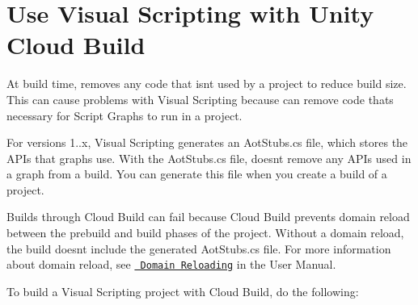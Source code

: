 \chapter{Use Visual Scripting with Unity Cloud Build}
\hypertarget{md__hey_tea_9_2_library_2_package_cache_2com_8unity_8visualscripting_0d1_88_80_2_documentation_0i_2vs-aot}{}\label{md__hey_tea_9_2_library_2_package_cache_2com_8unity_8visualscripting_0d1_88_80_2_documentation_0i_2vs-aot}
\label{md__hey_tea_9_2_library_2_package_cache_2com_8unity_8visualscripting_0d1_88_80_2_documentation_0i_2vs-aot_autotoc_md5168}%
%
 At build time,  removes any code that isn\textquotesingle{}t used by a project to reduce build size. This can cause problems with Visual Scripting because  can remove code that\textquotesingle{}s necessary for Script Graphs to run in a project.

For versions 1..\+x, Visual Scripting generates an {\ttfamily Aot\+Stubs.\+cs} file, which stores the  APIs that graphs use. With the {\ttfamily Aot\+Stubs.\+cs} file,  doesn\textquotesingle{}t remove any  APIs used in a graph from a build. You can generate this file when you create a build of a project.

Builds through  Cloud Build can fail because Cloud Build prevents domain reload between the prebuild and build phases of the project. Without a domain reload, the build doesn\textquotesingle{}t include the generated {\ttfamily Aot\+Stubs.\+cs} file. For more information about domain reload, see \href{https://docs.unity3d.com/Manual/DomainReloading.html}{\texttt{ Domain Reloading}} in the  User Manual.

To build a Visual Scripting project with Cloud Build, do the following\+:


